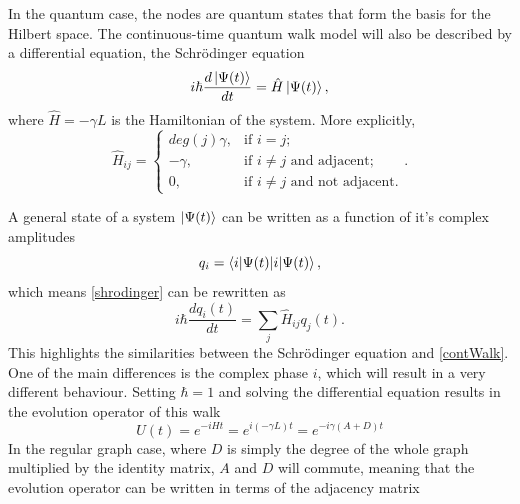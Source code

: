 \documentclass[../../dissertation.tex]{subfiles}
\begin{document}
In the quantum case, the nodes are quantum states that form the basis for the Hilbert space. The continuous-time quantum walk model will also be described by a differential equation, the Schrödinger equation
\begin{equation}
	i\hbar \frac{d\ket{\Psi(t)}}{dt} = \hat{H} \ket{\Psi(t)}, \label{shrodinger}
\end{equation}
where $\hat{H} = -\gamma L$ is the Hamiltonian of the system. More explicitly,
\begin{equation}
	\hat{H}_{ij} = \begin{cases} 
		deg(j)\gamma, & \mbox{if } i= j; \\ 
		-\gamma, & \mbox{if } i\neq j\mbox{ and adjacent};\\
		0, & \mbox{if } i\neq j\mbox{ and not adjacent}.
	\end{cases}.
	\label{Hamilt}
\end{equation}\par
A general state of a system $\ket{\Psi(t)}$ can be written as a function of it's complex amplitudes 
\begin{equation}
	q_i = \braket{i|\Psi(t)},
\end{equation}
which means \ref{shrodinger} can be rewritten as 
\begin{equation}
	i\hbar \frac{dq_i(t)}{dt} = \sum_j \hat{H}_{ij} q_j(t).
\end{equation}
This highlights the similarities between the Schrödinger equation and \ref{contWalk}. One of the main differences is the complex phase $i$, which will result in a very different behaviour. 
Setting $\hbar = 1$ and solving the differential equation results in the evolution operator of this walk 
\begin{equation}
	U(t) = e^{-iHt} = e^{i(-\gamma L)t} = e^{-i\gamma(A+D)t}
\end{equation}
In the regular graph case, where $D$ is simply the degree of the whole graph multiplied by the identity matrix, $A$ and $D$ will commute, meaning that the evolution operator can be written in terms of the adjacency matrix 
\end{document}
